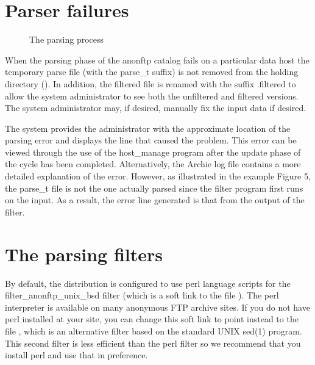 \section{Parser failures}

\begin{figure}
\begin{center}
\end{center}
\caption{The parsing process}
\end{figure}


When the parsing phase of the anonftp catalog fails on a particular data host
the temporary parse file (with the parse\_t suffix) is not removed from the
holding directory (). In addition, the filtered file is renamed
with the suffix .filtered to allow the system administrator to see both the
unfiltered and filtered versions. The system administrator may, if desired,
manually fix the input data if desired.



The system provides the administrator with the approximate location of the
parsing error and displays the line that caused the problem. This error can be
viewed through the use of the host\_manage program after the update phase of
the cycle has been completed. Alternatively, the Archie log file contains a
more detailed explanation of the error. However, as illustrated in the example
Figure 5, the parse\_t file is not the one actually parsed since the filter
program first runs on the input. As a result, the error line generated is that
from the output of the filter.


\section{The parsing filters}

By default, the distribution is configured to use perl language scripts for
the filter\_anonftp\_unix\_bsd filter (which is a soft link to the file
). The perl interpreter is available
on many anonymous FTP archive sites. If you do not have perl installed at your
site, you can change this soft link to point instead to the file
, which is an alternative filter based
on the standard UNIX sed(1) program. This second filter is less efficient than
the perl filter so we recommend that you install perl and use that in
preference.


